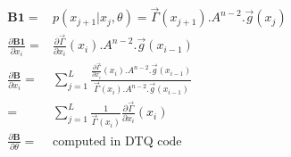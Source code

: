 \documentclass[a4paper,11pt]{article}
\begin{document}






\begin{align*}
\mathbf{B1} = & p(x_{j+1} | x_j, \theta) = \vec{\Gamma}(x_{j+1}) . A^{n - 2}. \vec{g}(x_{j}) \\
\frac{\partial \mathbf{B1}}{\partial x_i} = & \frac{\partial \vec{\Gamma}}{\partial x_i}(x_i) . A^{n- 2}. \vec{g}(x_{i-1})\\
\frac{\partial \mathbf{B}}{\partial x_i} = & \sum_{j=1}^{L} \frac{\frac{\partial \vec{\Gamma}}{\partial x_i}(x_i) . A^{n-2}. \vec{g}(x_{i-1})}{\vec{\Gamma}(x_{i}) . A^{n-2}. \vec{g}(x_{i-1})}\\
= & \sum_{j=1}^{L} \frac{1}{\vec{\Gamma}(x_i)} \frac{\partial \vec{\Gamma}}{\partial x_i}(x_i) \\
\frac{\partial \mathbf{B}}{\partial \theta} = & \text{computed in DTQ code}
\end{align*}
\end{document}
